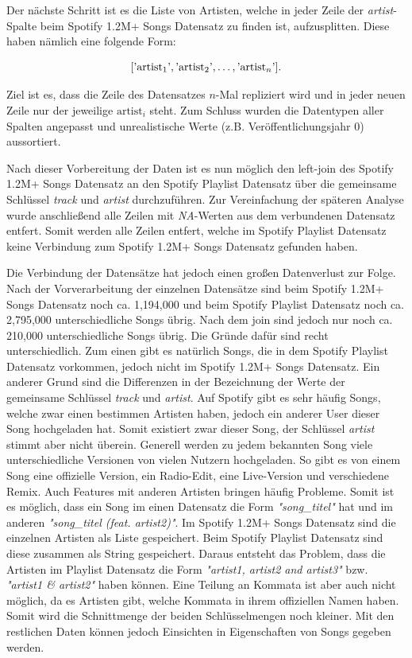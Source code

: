 \documentclass[conference]{IEEEtran}
\begin{document}
Der nächste Schritt ist es die Liste von Artisten, welche in jeder Zeile der \textit{artist}-Spalte beim Spotify 1.2M+ Songs Datensatz zu finden ist, aufzusplitten. Diese haben nämlich eine folgende Form:

$$
    [\text'\text{artist}_1\text', \text'\text{artist}_2\text', \dots, \text'\text{artist}_n\text'].
$$

Ziel ist es, dass die Zeile des Datensatzes $n$-Mal repliziert wird und in jeder neuen Zeile nur der jeweilige $\text{artist}_i$ steht. Zum Schluss wurden die Datentypen aller Spalten angepasst und unrealistische Werte (z.B. Veröffentlichungsjahr 0) aussortiert. 

Nach dieser Vorbereitung der Daten ist es nun möglich den left-join des Spotify 1.2M+ Songs Datensatz an den Spotify Playlist Datensatz über die gemeinsame Schlüssel \textit{track} und \textit{artist} durchzuführen. Zur Vereinfachung der späteren Analyse wurde anschließend alle Zeilen mit \textit{NA}-Werten aus dem verbundenen Datensatz entfert. Somit werden alle Zeilen entfert, welche im Spotify Playlist Datensatz keine Verbindung zum Spotify 1.2M+ Songs Datensatz gefunden haben.

Die Verbindung der Datensätze hat jedoch einen großen Datenverlust zur Folge. Nach der Vorverarbeitung der einzelnen Datensätze sind beim Spotify 1.2M+ Songs Datensatz noch ca. 1,194,000 und beim Spotify Playlist Datensatz noch ca. 2,795,000 unterschiedliche Songs übrig. Nach dem join sind jedoch nur noch ca. 210,000 unterschiedliche Songs übrig. Die Gründe dafür sind recht unterschiedlich. Zum einen gibt es natürlich Songs, die in dem Spotify Playlist Datensatz vorkommen, jedoch nicht im Spotify 1.2M+ Songs Datensatz. Ein anderer Grund sind die Differenzen in der Bezeichnung der Werte der gemeinsame Schlüssel \textit{track} und \textit{artist}. Auf Spotify gibt es sehr häufig Songs, welche zwar einen bestimmen Artisten haben, jedoch ein anderer User dieser Song hochgeladen hat. Somit existiert zwar dieser Song, der Schlüssel \textit{artist} stimmt aber nicht überein. Generell werden zu jedem bekannten Song viele unterschiedliche Versionen von vielen Nutzern hochgeladen. So gibt es von einem Song eine offizielle Version, ein Radio-Edit, eine Live-Version und verschiedene Remix. Auch Features mit anderen Artisten bringen häufig Probleme. Somit ist es möglich, dass ein Song im einen Datensatz die Form \textit{"song\_titel"} hat und im anderen \textit{"song\_titel (feat. artist2)"}. Im Spotify 1.2M+ Songs Datensatz sind die einzelnen Artisten als Liste gespeichert. Beim Spotify Playlist Datensatz sind diese zusammen als String gespeichert. Daraus entsteht das Problem, dass die Artisten im Playlist Datensatz die Form \textit{"artist1, artist2 and artist3"} bzw. \textit{"artist1 \& artist2"} haben können. Eine Teilung an Kommata ist aber auch nicht möglich, da es Artisten gibt, welche Kommata in ihrem offiziellen Namen haben. Somit wird die Schnittmenge der beiden Schlüsselmengen noch kleiner. Mit den restlichen Daten können jedoch Einsichten in Eigenschaften von Songs gegeben werden.
\end{document}
